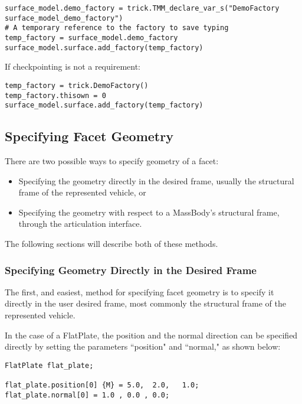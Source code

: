 \begin{verbatim}
surface_model.demo_factory = trick.TMM_declare_var_s("DemoFactory surface_model_demo_factory")
# A temporary reference to the factory to save typing
temp_factory = surface_model.demo_factory
surface_model.surface.add_factory(temp_factory)
\end{verbatim}

If checkpointing is not a requirement:

\begin{verbatim}
temp_factory = trick.DemoFactory()
temp_factory.thisown = 0
surface_model.surface.add_factory(temp_factory)
\end{verbatim}

\subsection{Specifying Facet Geometry}

There are two possible ways to specify geometry of a facet:

\begin{itemize}
\item{Specifying the geometry directly in the desired frame, usually the structural frame
of the represented vehicle, or}
\item{Specifying the geometry with respect to a MassBody's structural frame, through the
articulation interface.}
\end{itemize}

The following sections will describe both of these methods.

\subsubsection{Specifying Geometry Directly in the Desired Frame}

The first, and easiest, method for specifying facet geometry is
to specify it directly in the user desired frame, most commonly
the structural frame of the represented vehicle.

In the case of a FlatPlate, the position and the normal direction
can be specified directly by setting the parameters ``position" and
``normal," as shown below:

\begin{verbatim}
FlatPlate flat_plate;

flat_plate.position[0] {M} = 5.0,  2.0,   1.0;
flat_plate.normal[0] = 1.0 , 0.0 , 0.0;
\end{verbatim}

